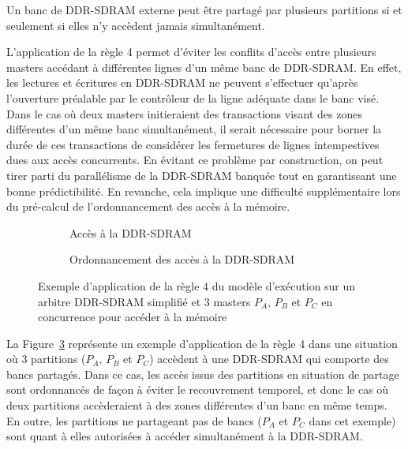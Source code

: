 \documentclass[main.tex]{subfiles}
\begin{document}
\begin{regleem}
    \label{em_resumeFr_regle4}
    Un banc de DDR-SDRAM externe peut être partagé par plusieurs partitions si et seulement si elles n'y accèdent jamais simultanément.
\end{regleem}

L'application de la règle 4 permet d'éviter les conflits d'accès entre plusieurs masters accédant à différentes lignes d'un même banc de DDR-SDRAM. En effet, les lectures et écritures en DDR-SDRAM ne peuvent s'effectuer qu'après l'ouverture préalable par le contrôleur de la ligne adéquate dans le banc visé. Dans le cas où deux masters initieraient des transactions visant des zones différentes d'un même banc simultanément, il serait nécessaire pour borner la durée de ces transactions de considérer les fermetures de lignes intempestives dues aux accès concurrents. En évitant ce problème par construction, on peut tirer parti du parallélisme de la DDR-SDRAM banquée tout en garantissant une bonne prédictibilité. En revanche, cela implique une difficulté supplémentaire lors du pré-calcul de l'ordonnancement des accès à la mémoire.

\begin{figure}
    \centering
    \begin{subfigure}[b]{0.3\linewidth}
    \centering
        \scalebox{0.6}{}
        \caption{Accès à la DDR-SDRAM}
        \label{fig_resumeFr_exampleRule4_ddr}
    \end{subfigure}\hspace{6mm}
    \begin{subfigure}[b]{0.65\linewidth}
    \centering
        
        \caption{Ordonnancement des accès à la DDR-SDRAM}
        \label{fig_resume_exampleRule4_diagram}
    \end{subfigure}
    \caption{Exemple d'application de la règle 4 du modèle d'exécution sur un arbitre DDR-SDRAM simplifié et 3 masters $P_A$, $P_B$ et $P_C$ en concurrence pour accéder à la mémoire}
    \label{fig_resumeFr_exampleRule4}
\end{figure}

La Figure~\ref{fig_resumeFr_exampleRule4} représente un exemple d'application de la règle 4 dans une situation où 3 partitions ($P_A$, $P_B$ et $P_C$) accèdent à une DDR-SDRAM qui comporte des bancs partagés. Dans ce cas, les accès issus des partitions en situation de partage sont ordonnancés de façon à éviter le recouvrement temporel, et donc le cas où deux partitions accèderaient à des zones différentes d'un banc en même temps. En outre, les partitions ne partageant pas de bancs ($P_A$ et $P_C$ dans cet exemple) sont quant à elles autorisées à accéder simultanément à la DDR-SDRAM.
\end{document}
